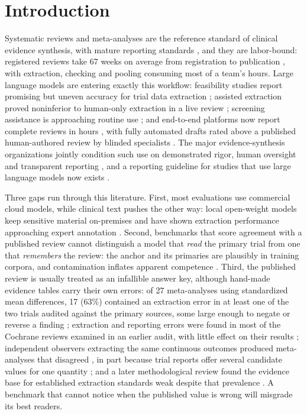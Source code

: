 \documentclass[11pt]{article}
\begin{document}
\section{Introduction}

Systematic reviews and meta-analyses are the reference standard of clinical evidence synthesis, with mature reporting standards \citep{page2021prisma}, and they are labor-bound: registered reviews take 67 weeks on average from registration to publication \citep{borah2017time}, with extraction, checking and pooling consuming most of a team's hours. Large language models are entering exactly this workflow: feasibility studies report promising but uneven accuracy for trial data extraction \citep{schmidt2024exploring,khraisha2024gpt4,konet2024extraction}; assisted extraction proved noninferior to human-only extraction in a live review \citep{lee2026noninferiority}; screening assistance is approaching routine use \citep{xie2026screening}; and end-to-end platforms now report complete reviews in hours \citep{bakker2026minutes}, with fully automated drafts rated above a published human-authored review by blinded specialists \citep{mclaughlin2026fully}. The major evidence-synthesis organizations jointly condition such use on demonstrated rigor, human oversight and transparent reporting \citep{flemyng2025position}, and a reporting guideline for studies that use large language models now exists \citep{gallifant2025tripodllm}.

Three gaps run through this literature. First, most evaluations use commercial cloud models, while clinical text pushes the other way: local open-weight models keep sensitive material on-premises and have shown extraction performance approaching expert annotation \citep{wiest2024privacy,spaanderman2025openweight}. Second, benchmarks that score agreement with a published review cannot distinguish a model that \emph{read} the primary trial from one that \emph{remembers} the review: the anchor and its primaries are plausibly in training corpora, and contamination inflates apparent competence \citep{xu2024contamination,golchin2024timetravel}. Third, the published review is usually treated as an infallible answer key, although hand-made evidence tables carry their own errors: of 27 meta-analyses using standardized mean differences, 17 (63\%) contained an extraction error in at least one of the two trials audited against the primary sources, some large enough to negate or reverse a finding \citep{gotzsche2007extraction}; extraction and reporting errors were found in most of the Cochrane reviews examined in an earlier audit, with little effect on their results \citep{jones2005errors}; independent observers extracting the same continuous outcomes produced meta-analyses that disagreed \citep{tendal2009disagreements}, in part because trial reports offer several candidate values for one quantity \citep{tendal2011multiplicity}; and a later methodological review found the evidence base for established extraction standards weak despite that prevalence \citep{mathes2017frequency}. A benchmark that cannot notice when the published value is wrong will misgrade its best readers.
\end{document}
